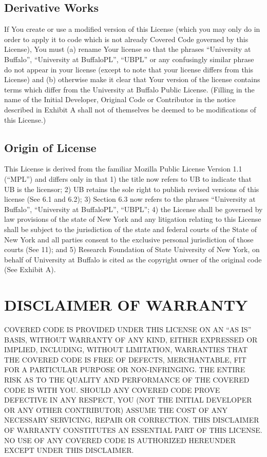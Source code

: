 \documentclass[letterpaper,colorlinks=true,linkcolor=blue]{book}
\begin{document}
\subsection{Derivative Works}
If You create or use a modified version of this License (which you may only do in order to apply it to code which is not already Covered Code governed by this License), You must (a) rename Your license so that the phrases ``University at Buffalo'', ``University at BuffaloPL'', ``UBPL'' or any confusingly similar phrase do not appear in your license (except to note that your license differs from this License) and (b) otherwise make it clear that Your version of the license contains terms which differ from the University at Buffalo Public License. (Filling in the name of the Initial Developer, Original Code or Contributor in the notice described in Exhibit A shall not of themselves be deemed to be modifications of this License.) 

\subsection{Origin of License}
This License is derived from the familiar Mozilla Public License Version 1.1 (``MPL'') and differs only in that 1) the title now refers to UB to indicate that UB is the licensor; 2) UB retains the sole right to publish revised versions of this license (See 6.1 and 6.2); 3) Section 6.3 now refers to the phrases ``University at Buffalo'', ``University at BuffaloPL'', ``UBPL'';  4) the License shall be governed by law provisions of the state of New York and any litigation relating to this License shall be subject to the jurisdiction of the state and federal courts of the State of New York and all parties consent to the exclusive personal jurisdiction of those courts (See 11); and 5) Research Foundation of State University of New York, on behalf of University at Buffalo is cited as the copyright owner of the original code (See Exhibit A).

\section{DISCLAIMER OF WARRANTY}
COVERED CODE IS PROVIDED UNDER THIS LICENSE ON AN ``AS IS'' BASIS, WITHOUT WARRANTY OF ANY KIND, EITHER EXPRESSED OR IMPLIED, INCLUDING, WITHOUT LIMITATION, WARRANTIES THAT THE COVERED CODE IS FREE OF DEFECTS, MERCHANTABLE, FIT FOR A PARTICULAR PURPOSE OR NON-INFRINGING. THE ENTIRE RISK AS TO THE QUALITY AND PERFORMANCE OF THE COVERED CODE IS WITH YOU. SHOULD ANY COVERED CODE PROVE DEFECTIVE IN ANY RESPECT, YOU (NOT THE INITIAL DEVELOPER OR ANY OTHER CONTRIBUTOR) ASSUME THE COST OF ANY NECESSARY SERVICING, REPAIR OR CORRECTION. THIS DISCLAIMER OF WARRANTY CONSTITUTES AN ESSENTIAL PART OF THIS LICENSE. NO USE OF ANY COVERED CODE IS AUTHORIZED HEREUNDER EXCEPT UNDER THIS DISCLAIMER. 
\end{document}
